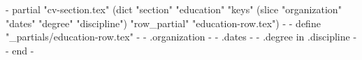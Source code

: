 {{- partial "cv-section.tex" (dict "section" "education" "keys" (slice "organization" "dates" "degree" "discipline") "row_partial" "education-row.tex") -}}
{{- define "_partials/education-row.tex" -}}
\subheading
{ {{- .organization -}} }{ {{- .dates -}} }
{ {{- .degree }} in {{ .discipline -}} }{}
{{- end -}}
